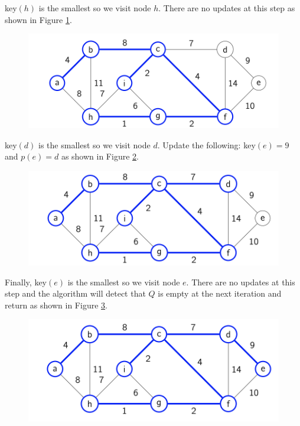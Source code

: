 \documentclass [12pt]{article}
\theoremstyle{definition}
\begin{document}
key$(h)$ is the smallest so we visit node $h$. There are no updates at this step as shown in Figure \ref{fig:prims_8}.

\begin{figure}[h!]
\centering
\includegraphics[scale=0.8]{prims_8.png}
\caption{}
\label{fig:prims_8}
\end{figure}

key$(d)$ is the smallest so we visit node $d$. Update the following: key$(e) = 9$ and $p(e) = d$ as shown in Figure \ref{fig:prims_9}.

\begin{figure}[h!]
\centering
\includegraphics[scale=0.8]{prims_9.png}
\caption{}
\label{fig:prims_9}
\end{figure}

Finally, key$(e)$ is the smallest so we visit node $e$. There are no updates at this step and the algorithm will detect that $Q$ is empty at the next iteration and return as shown in Figure \ref{fig:prims_10}.

\begin{figure}[h!]
\centering
\includegraphics[scale=0.8]{prims_10.png}
\caption{}
\label{fig:prims_10}
\end{figure}
\end{document}
